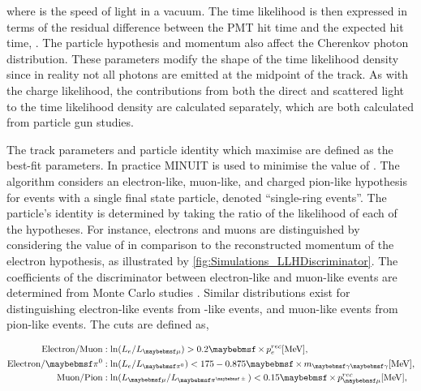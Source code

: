 where  is the speed of light in a vacuum. The time likelihood is then expressed in terms of the residual difference between the PMT hit time and the expected hit time, .
The particle hypothesis and momentum also affect the Cherenkov photon distribution. These parameters modify the shape of the time likelihood density since in reality not all photons are emitted at the midpoint of the track. As with the charge likelihood, the contributions from both the direct and scattered light to the time likelihood density are calculated separately, which are both calculated from particle gun studies.


The track parameters and particle identity which maximise  are defined as the best-fit parameters. In practice MINUIT \cite{James:2296388} is used to minimise the value of . The \fq algorithm considers an electron-like, muon-like, and charged pion-like hypothesis for events with a single final state particle, denoted ``single-ring events''. The particle's identity is determined by taking the ratio of the likelihood of each of the hypotheses. For instance, electrons and muons are distinguished by considering the value of  in comparison to the reconstructed momentum of the electron hypothesis, as illustrated by \autoref{fig:Simulations_LLHDiscriminator}. The coefficients of the discriminator between electron-like and muon-like events are determined from Monte Carlo studies \cite{t2k_tn_146}. Similar distributions exist for distinguishing electron-like events from -like events, and muon-like events from pion-like events. The cuts are defined as,

\begin{align}
  \begin{split}
    \text{Electron/Muon} &: \ln(L_{e}/L_{\mu}) > 0.2 \times p_{e}^{rec} [\text{MeV}], \\
    \text{Electron/\quickmath{\pi^{0}}} &: \ln(L_{e}/L_{\pi^{0}}) < 175 - 0.875 \times m_{\gamma\gamma} [\text{MeV}], \\
    \text{Muon/Pion} &: \ln(L_{\mu}/L_{\pi^{\pm}}) < 0.15 \times p_{\mu}^{rec} [\text{MeV}], \\
  \end{split}
\end{align}

